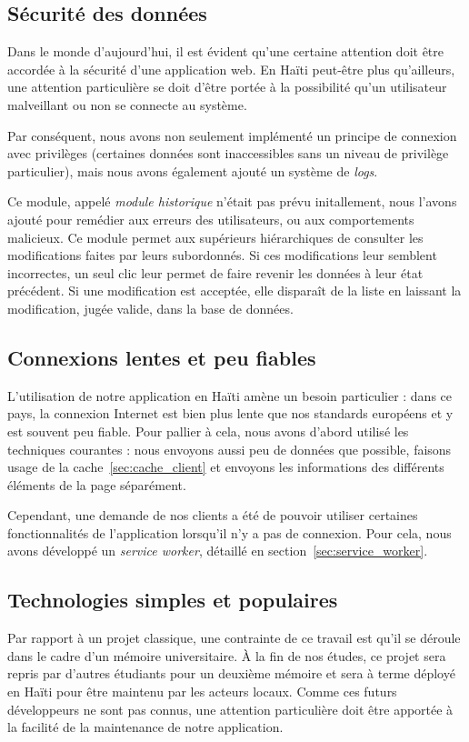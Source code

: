 \documentclass{EPL-master-thesis-covers-FR}
\begin{document}
			\subsection*{Sécurité des données}
				Dans le monde d'aujourd'hui, il est évident qu'une certaine attention doit être accordée à la sécurité d'une application web. En Haïti peut-être plus qu'ailleurs, une attention particulière se doit d'être portée à la possibilité qu'un utilisateur malveillant ou non se connecte au système.

				Par conséquent, nous avons non seulement implémenté un principe de connexion avec privilèges (certaines données sont inaccessibles sans un niveau de privilège particulier), mais nous avons également ajouté un système de \emph{logs}.

				Ce module, appelé \emph{module historique} n'était pas prévu initallement, nous l'avons ajouté pour remédier aux erreurs des utilisateurs, ou aux comportements malicieux. Ce module permet aux supérieurs hiérarchiques de consulter les modifications faites par leurs subordonnés. Si ces modifications leur semblent incorrectes, un seul clic leur permet de faire revenir les données à leur état précédent. Si une modification est acceptée, elle disparaît de la liste en laissant la modification, jugée valide, dans la base de données.

			\subsection*{Connexions lentes et peu fiables}
				L'utilisation de notre application en Haïti amène un besoin particulier : dans ce pays, la connexion Internet est bien plus lente que nos standards européens et y est souvent peu fiable. Pour pallier à cela, nous avons d'abord utilisé les techniques courantes : nous envoyons aussi peu de données que possible, faisons usage de la cache~\ref{sec:cache_client} et envoyons les informations des différents éléments de la page séparément.

				Cependant, une demande de nos clients a été de pouvoir utiliser certaines fonctionnalités de l'application lorsqu'il n'y a pas de connexion. Pour cela, nous avons développé un \emph{service worker}, détaillé en section~\ref{sec:service_worker}.

			\subsection*{Technologies simples et populaires}
				Par rapport à un projet classique, une contrainte de ce travail est qu'il se déroule dans le cadre d'un mémoire universitaire. À la fin de nos études, ce projet sera repris par d'autres étudiants pour un deuxième mémoire et sera à terme déployé en Haïti pour être maintenu par les acteurs locaux. Comme ces futurs développeurs ne sont pas connus, une attention particulière doit être apportée à la facilité de la maintenance de notre application.
\end{document}
